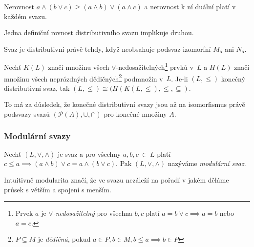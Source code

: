 \begin{claim}
    Nerovnost
    $a \wedge (b \vee c) \geq (a \wedge b) \vee (a \wedge c)$
    a nerovnost k ní duální
    platí v každém svazu.
\end{claim}

\begin{claim}
    Jedna definiční rovnost distributivního svazu implikuje druhou.
\end{claim}

\begin{claim}
    Svaz je distributivní právě tehdy, když neobsahuje podsvaz izomorfní
    $M_5$ ani $N_5$.
\end{claim}

\begin{theorem}
    Nechť $K(L)$ značí množinu všech $\vee$-nedosažitelných\footnote{
    Prvek $a$ je {\em $\vee$-nedosažitelný} pro všechna $b,c$ platí
    $a = b \vee c \implies a = b$ nebo $a = c$.} prvků v~$L$
    a $H(L)$ značí množinu všech neprázdných dědičných\footnote{
    $P \subseteq M$ je {\em dědičná}, pokud $a \in P, b \in M, b \leq a
    \implies b \in P$} podmnožin v~$L$.
    Je-li $(L, \leq)$ konečný distributivní svaz, tak
    $(L, \leq) \cong (H(K(L, \leq), \leq, \subseteq)$.
\end{theorem}

To má za důsledek, že
konečné distributivní svazy jsou až na isomorfismus právě podsvazy
svazů $(\mathcal{P}(A), \cup, \cap)$ pro konečné množiny $A$.

\subsubsection{Modulární svazy}

\begin{definition}
    Nechť $(L, \vee, \wedge)$ je svaz a pro všechny $a, b, c~\in~L$
    platí
    $c \leq a \implies (a \wedge b) \vee c = a \wedge (b \vee c)$.
    Pak $(L, \vee, \wedge)$ nazýváme {\em modulární svaz}.
\end{definition}

Intuitivně modularita značí, že
ve svazu nezáleží na pořadí v jakém děláme průsek
s větším a spojení s menším.


